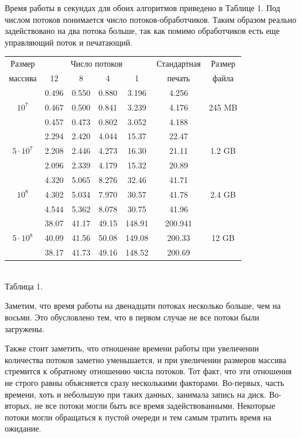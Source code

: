 Время работы в секундах для обоих алгоритмов приведено в Таблице 1.
Под числом потоков понимается число потоков-обработчиков. 
Таким образом реально задействовано на два потока больше, так как помимо обработчиков есть еще управляющий поток и печатающий.
\begin{center}
\begin{tabular}{||c|c|c|c|c|c|c||}
\hline
\hline
Размер & \multicolumn{4}{c|}{Число потоков} & Стандартная & Размер\\
\hhline{~|-|-|-|-|~|~|}
массива & 12 & 8 & 4 & 1 & печать &файла\\
\hline
\hline
 & 0.496 & 0.550 & 0.880 & 3.196 & 4.256 & \\
\hhline{~|-|-|-|-|-|~|}
$10^7$   & 0.467 & 0.500 & 0.841 & 3.239 & 4.176 & 245 MB \\
\hhline{~|-|-|-|-|-|~|}
 & 0.457 & 0.473 & 0.802 & 3.052 & 4.188 &\\
\hline
&2.294 & 2.420 & 4.044 & 15.37 & 22.47 & \\
\hhline{~|-|-|-|-|-|~|}
$5 \cdot 10^7$  & 2.208 & 2.446 & 4.273 & 16.30 & 21.11 &  1.2 GB\\
\hhline{~|-|-|-|-|-|~|}
 & 2.096 & 2.339 & 4.179 & 15.32 & 20.89 & \\
\hline
 & 4.320 & 5.065 & 8.276 & 32.46 & 41.71 & \\
\hhline{~|-|-|-|-|-|~|}
$10^8$  & 4.302 & 5.034 & 7.970 & 30.57 & 41.78 & 2.4 GB\\
\hhline{~|-|-|-|-|-|~|}
& 4.544 & 5.362& 8.078 & 30.75 & 41.96 & \\
\hline
 & 38.07 & 41.17 & 49.15 & 148.91 & 200.941 & \\
\hhline{~|-|-|-|-|-|~|}
$5 \cdot 10^8$ & 40.09 & 41.56 & 50.08 & 149.08 & 200.33 & 12 GB\\
\hhline{~|-|-|-|-|-|~|}
 & 38.17& 41.73& 49.16 & 148.52 & 200.69 & \\
\hline
\hline
\end{tabular}\\ \vspace{10pt}
\small{Таблица 1.}
\end{center}
Заметим, что время работы на двенадцати потоках несколько больше, чем на восьми. 
Это обусловлено тем, что в первом случае не все потоки были загружены.

Также стоит заметить, что отношение времени работы при увеличении количества потоков заметно уменьшается, и при увеличении размеров массива стремится к обратному отношению числа потоков.
Тот факт, что эти отношения не строго равны объясняется сразу несколькими факторами.
Во-первых, часть времени, хоть и небольшую при таких данных, занимала запись на диск.
Во-вторых, не все потоки могли быть все время задействованными.
Некоторые потоки могли обращаться к пустой очереди и тем самым тратить время на ожидание.

